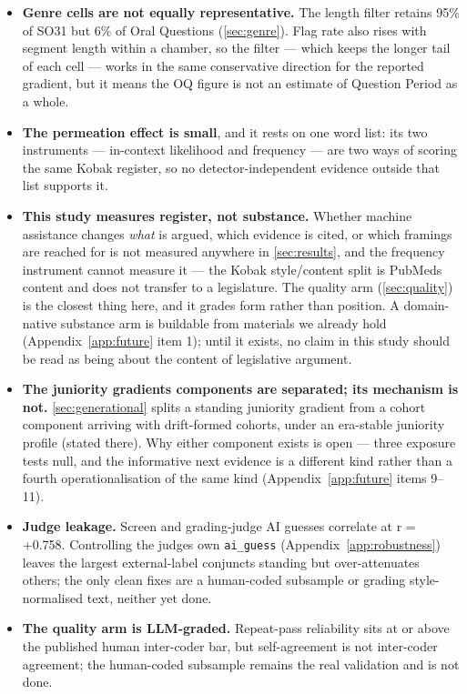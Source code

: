 \begin{itemize}
  the pool --- CA-FED flat, the US House and US Senate on gradual multi-decade
  climbs with no discrete step. Tasmania, the twenty-first, is the sole
  exclusion. What bounds the check is its resolution: it reads two
  convention-tracking markers, not all of them.
\item
  \textbf{Genre cells are not equally representative.} The length filter retains
  95\% of SO31 but 6\% of Oral Questions (\cref{sec:genre}). Flag rate also rises with
  segment length within a chamber, so the filter --- which keeps the longer
  tail of each cell --- works in the same conservative direction for the
  reported gradient, but it means the OQ figure is not an estimate of
  Question Period as a whole.
\item
  \textbf{The permeation effect is small}, and it rests on one word list: its two
  instruments --- in-context likelihood and frequency --- are two ways of scoring
  the same Kobak register, so no detector-independent evidence outside that
  list supports it.
\item
  \textbf{This study measures register, not substance.} Whether machine assistance
  changes \emph{what} is argued, which evidence is cited, or which framings are
  reached for is not measured anywhere in \cref{sec:results}, and the frequency instrument
  cannot measure it --- the Kobak style/content split is PubMed\textquotesingle s content and
  does not transfer to a legislature. The quality arm (\cref{sec:quality}) is the closest
  thing here, and it grades form rather than position. A domain-native
  substance arm is buildable from materials we already hold (Appendix~\ref{app:future} item 1);
  until it exists, no claim in this study should be read as being about the
  content of legislative argument.
\item
  \textbf{The juniority gradient\textquotesingle s components are separated; its mechanism is
  not.} \cref{sec:generational} splits a standing juniority gradient from a cohort component
  arriving with drift-formed cohorts, under an era-stable juniority profile
  (stated there). Why either component exists is open --- three exposure tests
  null, and the informative next evidence is a different kind rather than a
  fourth operationalisation of the same kind (Appendix~\ref{app:future} items 9--11).
\item
  \textbf{Judge leakage.} Screen and grading-judge AI guesses correlate at
  r = +0.758. Controlling the judge\textquotesingle s own \texttt{ai\_guess} (Appendix~\ref{app:robustness}) leaves the
  largest external-label conjuncts standing but over-attenuates others; the
  only clean fixes are a human-coded subsample or grading style-normalised
  text, neither yet done.
\item
  \textbf{The quality arm is LLM-graded.} Repeat-pass reliability sits at or above
  the published human inter-coder bar, but self-agreement is not inter-coder
  agreement; the human-coded subsample remains the real validation and is not
  done.
\end{itemize}

